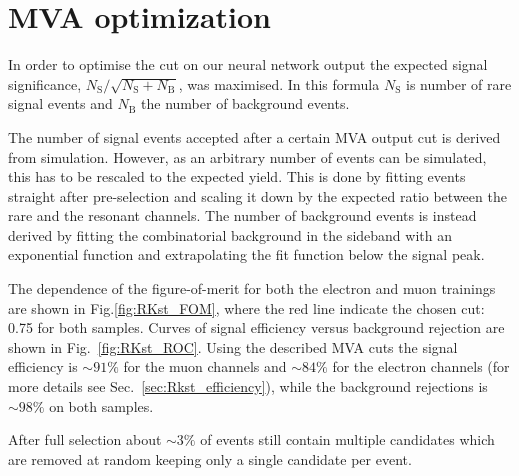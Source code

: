 \section{MVA optimization}

In order to optimise the cut on our neural network output the expected signal significance,
$N_{\mathrm{S}}/\sqrt{N_{\mathrm{S}}+N_{\mathrm{B}}}$, was maximised.
In this formula $N_\mathrm{S}$ is number of rare signal events and $N_\mathrm{B}$ the number of background events.

The number of signal events accepted after a certain MVA output cut is derived from simulation.
However, as an arbitrary number of events can be simulated, this has to be rescaled to the expected yield.
This is done by fitting \decay{\Bz}{\Kstar(\jpsi\to\ell^+\ell^-)} events straight after pre-selection
and scaling it down by the expected ratio between the rare and the resonant channels.
The number of background events is instead derived by fitting the combinatorial background in the sideband
with an exponential function and extrapolating the fit function below the signal peak.

The dependence of the figure-of-merit for both the electron and muon trainings
are shown in Fig.\ref{fig:RKst_FOM}, where the red line indicate the chosen cut: 0.75 for both samples.
Curves of signal efficiency versus background rejection are shown in Fig.~\ref{fig:RKst_ROC}.
Using the described MVA cuts the signal efficiency is $\sim 91\%$ for the muon channels
and $\sim 84\%$ for the electron channels (for more details see Sec.~\ref{sec:Rkst_efficiency}),
while the background rejections is $\sim 98\%$ on both samples.

After full selection about $\sim 3\%$ of events still contain multiple candidates
which are removed at random keeping only a single candidate per event.





